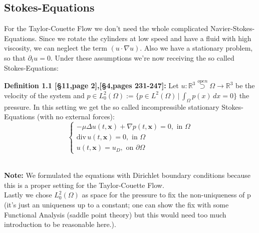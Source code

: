 \documentclass[12pt,a4paper]{report}
\begin{document}
\subsection{Stokes-Equations}
For the Taylor-Couette Flow we don't need the whole complicated Navier-Stokes-Equations. Since we rotate the cylinders at low speed and have a fluid with high viscosity, we can neglect the term \((u \cdot \nabla u)\). Also we have a stationary problem, so that \(\partial_t u=0\). Under these assumptions we're now receiving the so called Stokes-Equations:\\
\colorbox{defblue}{\begin{minipage}{15cm}{\textcolor{black}{}{\label{def1.1}}}
\textbf{Definition 1.1 \cite{scalingRey}[§11,page 2],\cite{GaldiNavierStokes}[§4,pages 231-247]:} Let \(u:\mathbb{R}^3 \stackrel{open}{\supset} \Omega \to \mathbb{R}^3\) be the velocity of the system and \(p \in L^2_0(\Omega) := \{p \in L^2(\Omega) \, | \, \int_{\Omega} p(x)\, dx = 0\}\) the pressure. In this setting we get the so called incompressible stationary Stokes-Equations (with no external forces):
\begin{equation}
\begin{cases}
    -\mu \Delta u(t,\textbf{x}) + \nabla p(t,\textbf{x}) = 0, \text{ in } \Omega\\
    \text{div}\,u(t,\textbf{x}) = 0, \text{ in } \Omega\\
    u(t,\textbf{x}) = u_D, \text{ on } \partial \Omega
\end{cases}
\end{equation}
\end{minipage}}\\

\textbf{Note:} We formulated the equations with Dirichlet boundary conditions because this is a proper setting for the Taylor-Couette Flow. \\Lastly we chose \(L^2_0(\Omega)\) as space for the pressure to fix the non-uniqueness of p (it's just an uniqueness up to a constant; one can show the fix with some Functional Analysis (saddle point theory) but this would need too much introduction to be reasonable here.).
\newpage
\end{document}
